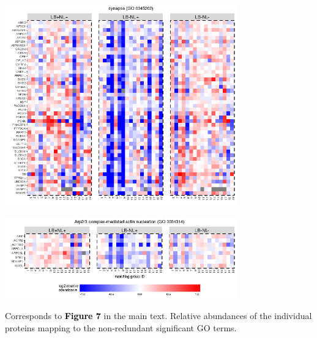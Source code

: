 \documentclass[11pt]{article}\usepackage[]{graphicx}\usepackage[usenames,dvipsnames]{color}
\newenvironment{knitrout}{}{} %
\begin{document}
\begin{knitrout}
\color{fgcolor}

{\centering \includegraphics[width=0.75\textwidth]{figure/toppath_heatmaps_2-1} 

}



\end{knitrout}
\begin{knitrout}
\color{fgcolor}

{\centering \includegraphics[width=0.75\textwidth]{figure/toppath_heatmaps_1-1} 

}



\end{knitrout}
Corresponds to
\textcolor{black}{\colorbox{highlighter}{\textbf{Figure 7}}} in the main text.
Relative abundances of the individual proteins mapping to the non-redundant 
significant GO terms.



\clearpage


\end{document}
